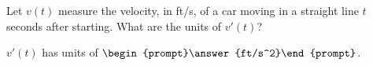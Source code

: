 \documentclass{ximera}
\author{Gregory Hartman \and Matthew Carr}
\begin{document}
\begin{exercise}





Let $v(t)$ measure the velocity, in ft/s, of a car moving in a straight line $t$ seconds after starting. What are the units of $v'(t)$?

\begin{center}
$v'(t)$ has units of $\begin{prompt}\answer{ft/s^2}\end{prompt}$.
\end{center}

\end{exercise}
\end{document}
